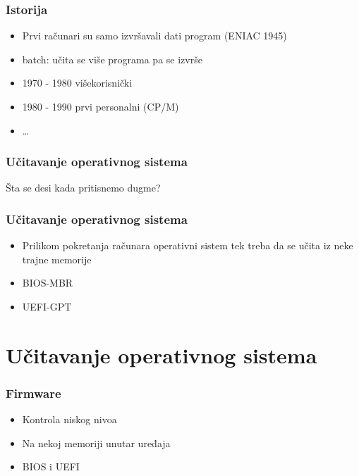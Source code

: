 \documentclass{beamer}
\begin{document}
\begin{frame}
    \frametitle{Istorija}
    \begin{itemize}
        \item Prvi računari su samo izvršavali dati program (ENIAC 1945) \newline
        \item batch: učita se više programa pa se izvrše \newline
        \item 1970 - 1980 višekorisnički \newline
        \item 1980 - 1990 prvi personalni (CP/M) \newline
        \item \dots
    \end{itemize}
\end{frame}

\begin{frame}
    \frametitle{Učitavanje operativnog sistema}
    \begin{center}
        \large{Šta se desi kada pritisnemo dugme?}
    \end{center}
\end{frame}

\begin{frame}
    \frametitle{Učitavanje operativnog sistema}
    \begin{itemize}
        \item Prilikom pokretanja računara operativni sistem tek treba da se učita iz neke trajne memorije \newline
        \item BIOS-MBR \newline
        \item UEFI-GPT
    \end{itemize}
\end{frame}

\section*{Učitavanje operativnog sistema}
\begin{frame}
    \frametitle{Firmware}
    \begin{itemize}
        \item Kontrola niskog nivoa \newline
        \item Na nekoj memoriji unutar uređaja \newline
        \item BIOS i UEFI
    \end{itemize}
\end{frame}
\end{document}
